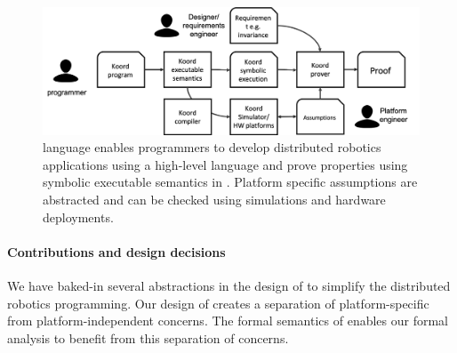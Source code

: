 \begin{figure}[h!]
            \captionsetup{font=scriptsize}

\includegraphics[width=\linewidth]{figs/koorduser.png}
\caption{\lgname language enables programmers to develop distributed robotics applications using a high-level language and prove properties using symbolic executable semantics in \K.
    Platform specific assumptions are abstracted and can be checked using simulations and hardware deployments.}
\label{fig:koorduser}
\end{figure}


\paragraph{Contributions and design decisions}

We have baked-in several abstractions in the design of \lgname to simplify the distributed robotics programming.
Our design of \lgname creates a separation of platform-specific from platform-independent concerns.
The formal semantics of \lgname enables our formal analysis to benefit from this separation of concerns.

